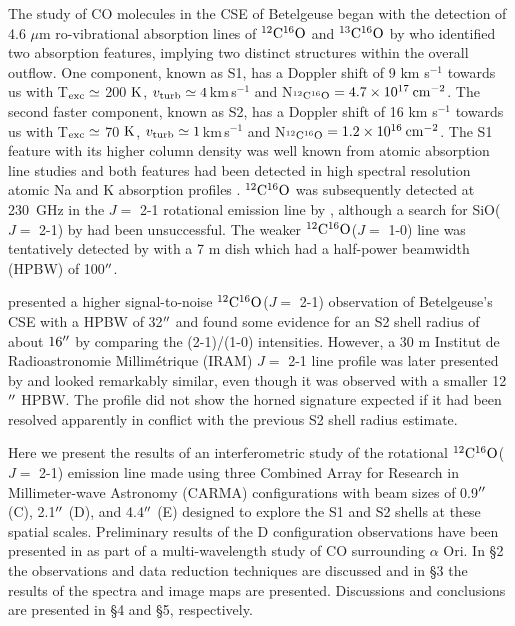 \documentclass[iop]{emulateapj}
\begin{document}
The study of CO molecules in the CSE of Betelgeuse began with the detection of 4.6 $\mu$m ro-vibrational absorption lines of $\rm{{}^{12}C^{16}O}$ and $\rm{{}^{13}C^{16}O}$ by \cite{1979ApJ...233L.135B} who identified two absorption features, implying two distinct structures within the overall outflow. One component, known as S1, has a Doppler shift of 9 km s${}^{-1}$ towards us with T$_{\rm{exc}} \simeq$ 200 $\rm{K}$, $v_{\rm{turb}}\simeq 4$\,km\,s${}^{-1}$ and N$_{\rm{^{12}C^{16}O}}=4.7\times 10^{17}\>{\rm cm}^{-2}$. The second faster component, known as S2, has a Doppler shift of 16 km s${}^{-1}$ towards us with T$_{\rm{exc}} \simeq$ 70 $\rm{K}$, $v_{\rm{turb}}\simeq 1$\,km\,s${}^{-1}$ and N$_{\rm{^{12}C^{16}O}}=1.2\times 10^{16}\>{\rm cm}^{-2}$. The S1 feature with its higher column density was well known from atomic absorption line studies \citep[e.g.][]{1962ApJ...136..844W} and both features had been detected in high spectral resolution atomic Na and K absorption profiles \citep{1975ApJ...199..427G}. $\rm{{}^{12}C^{16}O}$ was subsequently detected at 230~GHz in the $J=$ 2-1 rotational emission line by \cite{1980ApJ...242L..25K}, although a search for SiO($J=$ 2-1) by \cite{1978ApJ...221..854L} had been unsuccessful. The weaker $\rm{{}^{12}C^{16}O}$($J=$ 1-0) line was tentatively detected by \cite{1985ApJ...292..640K} with a 7 m dish which had a half-power beamwidth (HPBW) of 100$\mbox{$^{\prime\prime}$}$.

\cite{1987ApJ...313..400H} presented a higher signal-to-noise $\rm{{}^{12}C^{16}O}$($J=$ 2-1) observation of Betelgeuse's CSE with a HPBW of 32$\mbox{$^{\prime\prime}$}$ and found some evidence for an S2 shell radius of about $16\mbox{$^{\prime\prime}$}$ by comparing the  (2-1)/(1-0) intensities. However,  a 30 m Institut de Radioastronomie Millim\'etrique (IRAM) $J=$ 2-1 line profile was later presented by  \cite{1994ApJ...424L.127H} and looked remarkably similar, even though it was observed with a smaller 12$\mbox{$^{\prime\prime}$}$ HPBW. The profile did not show the horned signature expected if it had been resolved apparently in conflict with the previous S2 shell radius estimate.

Here we present the results of an interferometric study of the rotational $\rm{{}^{12}C^{16}O}$($J=$ 2-1) emission line made using three Combined Array for Research in Millimeter-wave Astronomy (CARMA) configurations with beam sizes of 0.9$\mbox{$^{\prime\prime}$}$ (C), 2.1$\mbox{$^{\prime\prime}$}$ (D), and 4.4$\mbox{$^{\prime\prime}$}$ (E) designed to explore the S1 and S2 shells at these spatial scales.  Preliminary results of the D configuration observations have been presented in \cite{2009AIPC.1094..868H} as part of a multi-wavelength study of CO surrounding $\alpha$ Ori. In \S2 the observations and data reduction techniques are discussed and in \S3 the results of the spectra and image maps are presented. Discussions and conclusions are presented in \S4 and \S5, respectively.
\end{document}
